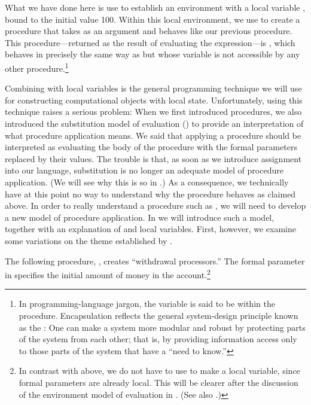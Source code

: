 \noindent
What we have done here is use  to establish an environment with a
local variable , bound to the initial value 100.  Within this
local environment, we use  to create a procedure that takes
 as an argument and behaves like our previous 
procedure.  This procedure---returned as the result of evaluating the
 expression---is , which behaves in precisely the
same way as  but whose variable  is not accessible
by any other procedure.\footnote{In programming-language jargon, the variable
 is said to be  within the
 procedure.  Encapsulation reflects the general
system-design principle known as the : One can make a
system more modular and robust by protecting parts of the system from each
other; that is, by providing information access only to those parts of the
system that have a ``need to know.''}

Combining  with local variables is the general programming technique
we will use for constructing computational objects with local state.
Unfortunately, using this technique raises a serious problem: When we first
introduced procedures, we also introduced the substitution model of evaluation
() to provide an interpretation of what procedure
application means.  We said that applying a procedure should be interpreted as
evaluating the body of the procedure with the formal parameters replaced by
their values.  The trouble is that, as soon as we introduce assignment into our
language, substitution is no longer an adequate model of procedure application.
(We will see why this is so in .)  As a consequence, we
technically have at this point no way to understand why the 
procedure behaves as claimed above.  In order to really understand a procedure
such as , we will need to develop a new model of procedure
application.  In  we will introduce such a model, together
with an explanation of  and local variables.  First, however, we
examine some variations on the theme established by .

The following procedure, , creates ``withdrawal
processors.''  The formal parameter  in 
specifies the initial amount of money in the account.\footnote{In contrast with
 above, we do not have to use  to make
 a local variable, since formal parameters are already local.
This will be clearer after the discussion of the environment model of
evaluation in .  (See also .)}

